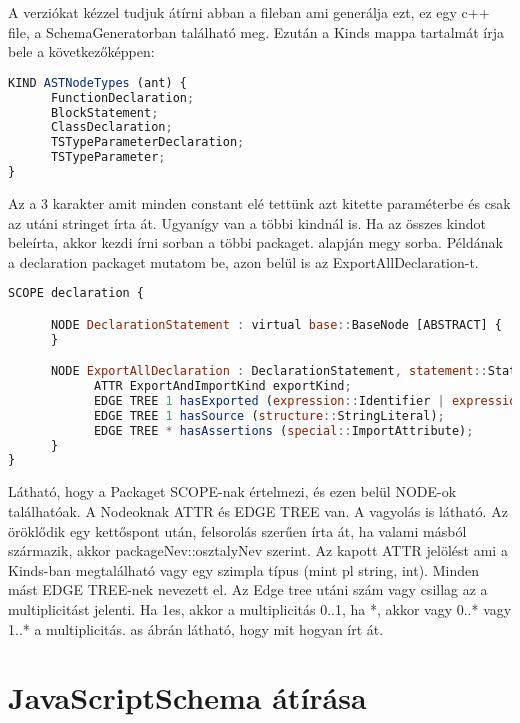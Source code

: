 A verziókat kézzel tudjuk átírni abban a fileban ami generálja ezt, ez egy c++ file, a SchemaGeneratorban található meg.
Ezután a Kinds mappa tartalmát írja bele a következőképpen:
\begin{lstlisting}[caption={Asg file kind},label={lst:asg_file_kinds}, language={JavaScript}]
KIND ASTNodeTypes (ant) {
      FunctionDeclaration;
      BlockStatement;
      ClassDeclaration;
      TSTypeParameterDeclaration;
      TSTypeParameter;
}
\end{lstlisting}
Az a 3 karakter amit minden constant elé tettünk azt kitette paraméterbe és csak az utáni stringet írta át. Ugyanígy van a többi kindnál is.
Ha az összes kindot beleírta, akkor kezdi írni sorban a többi packaget.  alapján megy sorba.
Példának a declaration packaget mutatom be, azon belül is az ExportAllDeclaration-t.
\begin{lstlisting}[caption={Asg file ExportAllDeclaration},label={lst:asg_file_export_all_declaration}, language={JavaScript}]
SCOPE declaration {

      NODE DeclarationStatement : virtual base::BaseNode [ABSTRACT] {
      }

      NODE ExportAllDeclaration : DeclarationStatement, statement::Statement, virtual statement::ProgramStatement, special::Node {
            ATTR ExportAndImportKind exportKind;
            EDGE TREE 1 hasExported (expression::Identifier | expression::LiteralExpression);
            EDGE TREE 1 hasSource (structure::StringLiteral);
            EDGE TREE * hasAssertions (special::ImportAttribute);
      }
}
\end{lstlisting}
Látható, hogy a Packaget SCOPE-nak értelmezi, és ezen belül NODE-ok találhatóak.
A Nodeoknak ATTR és EDGE TREE van. A vagyolás is látható.
Az öröklődik egy kettőspont után, felsorolás szerűen írta át, ha valami másból származik, akkor packageNev::osztalyNev szerint.
Az kapott ATTR jelölést ami a Kinds-ban megtalálható vagy egy szimpla típus (mint pl string, int).
Minden mást EDGE TREE-nek nevezett el. Az Edge tree utáni szám vagy csillag az a multiplicitást jelenti.
Ha 1es, akkor a multiplicitás 0..1, ha *, akkor vagy 0..* vagy 1..* a multiplicitás.
as ábrán látható, hogy mit hogyan írt át.

\section{JavaScriptSchema átírása}

